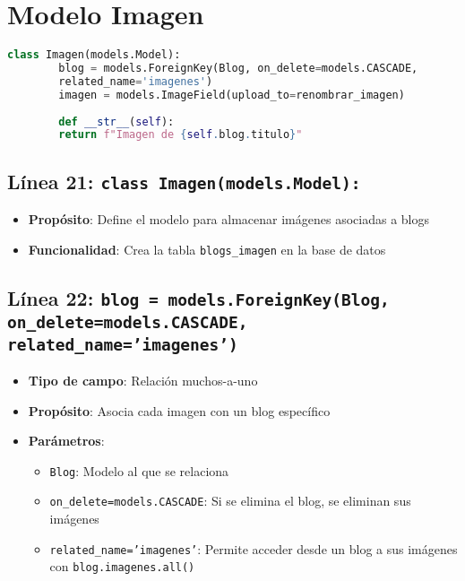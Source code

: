 \documentclass[12pt,a4paper]{article}
\begin{document}
	\section{Modelo Imagen}
	
	\begin{lstlisting}[language=Python]
		class Imagen(models.Model):
		blog = models.ForeignKey(Blog, on_delete=models.CASCADE, 
		related_name='imagenes')
		imagen = models.ImageField(upload_to=renombrar_imagen)
		
		def __str__(self):
		return f"Imagen de {self.blog.titulo}"
	\end{lstlisting}
	
	\subsection{Línea 21: \texttt{class Imagen(models.Model):}}
	\begin{itemize}
		\item \textbf{Propósito}: Define el modelo para almacenar imágenes asociadas a blogs
		\item \textbf{Funcionalidad}: Crea la tabla \texttt{blogs\_imagen} en la base de datos
	\end{itemize}
	
	\subsection{Línea 22: \texttt{blog = models.ForeignKey(Blog, on\_delete=models.CASCADE, related\_name='imagenes')}}
	\begin{itemize}
		\item \textbf{Tipo de campo}: Relación muchos-a-uno
		\item \textbf{Propósito}: Asocia cada imagen con un blog específico
		\item \textbf{Parámetros}:
		\begin{itemize}
			\item \texttt{Blog}: Modelo al que se relaciona
			\item \texttt{on\_delete=models.CASCADE}: Si se elimina el blog, se eliminan sus imágenes
			\item \texttt{related\_name='imagenes'}: Permite acceder desde un blog a sus imágenes con \texttt{blog.imagenes.all()}
		\end{itemize}
	\end{itemize}
	
\end{document}
